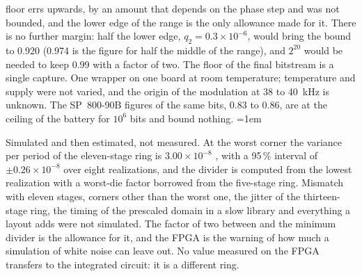 \begin{description}
floor errs upwards, by an amount that depends on the phase step and was
not bounded, and the lower edge of the range is the only allowance made
for it. There is no further margin: half the lower edge,
$q_2 = 0.3\times10^{-6}$, would bring the bound to 0.920 \est{} (0.974 is
the figure for half the middle of the range), and $2^{20}$ would be
needed to keep 0.99 with a factor of two. The floor of the final
bitstream is a single capture. One
wrapper on one board at room temperature; temperature and supply were
not varied, and the origin of the modulation at 38 to 40~kHz is unknown.
The SP~800-90B figures of the same bits, 0.83 to 0.86, are at the
ceiling of the battery for $10^6$ bits and bound nothing.
\emergencystretch=1em
\item[Min-entropy on the integrated circuit.] Simulated
and then estimated, not measured. At the worst corner the variance per
period of the eleven-stage ring is $3.00\times10^{-8}$ \simu{}, with a
95\,\% interval of $\pm0.26\times10^{-8}$ over eight realizations, and
the divider \est{} is computed from the lowest
realization with a worst-die factor borrowed from the five-stage ring.
Mismatch with eleven stages, corners other than the worst one, the
jitter of the thirteen-stage ring, the timing of the prescaled domain in
a slow library and everything a layout adds were not simulated. The
factor of two between  and the minimum divider  is the
allowance for it, and the \ac{FPGA} is the warning of how much a
simulation of white noise can leave out. No value measured on the
\ac{FPGA} transfers to the integrated circuit: it is a different ring.
\end{description}
